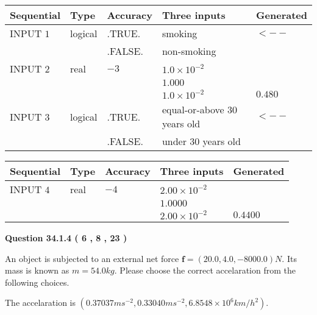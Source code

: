 \documentclass[12pt]{article}
\begin{document}
   
  
  
\noindent\begin{tabular}{|l|l|l|l|l|}
\hline
 Sequential & Type & Accuracy & Three inputs & Generated \\ 
\hline
 
 
  INPUT $            1 $ & logical & .TRUE. & 
 smoking & 
  $ <-- $ 
  \\
  & & .FALSE. & 
  non-smoking & 
 \\  \hline  
 
 
  INPUT $            2 $ & real & $           -3  $ & $
 1.0 \times 10^{-2}
  $ & \\
  & & &  $
 1.000
  $ & \\
  & & &  $
 1.0 \times 10^{-2}
 $ & $ 0.480 $ 
 \\  \hline  
 
 
  INPUT $            3 $ & logical & .TRUE. & 
 equal-or-above 30 years old & 
  $ <-- $ 
  \\
  & & .FALSE. & 
  under 30 years old & 
 \\  \hline  
 \end{tabular}
   
   
  
  
\noindent\begin{tabular}{|l|l|l|l|l|}
\hline
 Sequential & Type & Accuracy & Three inputs & Generated \\ 
\hline
 
 
  INPUT $            4 $ & real & $           -4  $ & $
 2.00 \times 10^{-2}
  $ & \\
  & & &  $
 1.0000
  $ & \\
  & & &  $
 2.00 \times 10^{-2}
 $ & $ 0.4400 $ 
 \\  \hline  
 \end{tabular}
   
   
  
\vspace{0.2in}
  
{\textbf{\Large{Question
34.1.4 
 (           6 ,           8 ,          23 )
}}}
  
  
 
An object is subjected to an external net force $\mathbf{f}=(
20.0 ,
4.0,
-8000.0  )N$. Its mass is known as
$m= %
54.0  kg$. Please choose the correct accelaration
from the following choices.
 
 
 
The accelaration is
$(
0.37037ms^{-2},
0.33040ms^{-2},
6.8548 \times 10^{6}km/h^2
).
$
 
\end{document}
